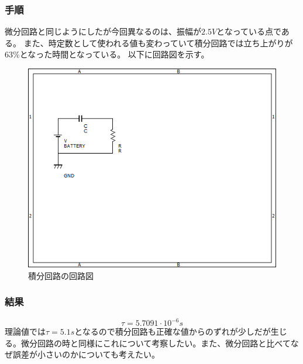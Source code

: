 \documentclass{jsarticle}
\begin{document}
\subsubsection{手順}
微分回路と同じようにしたが今回異なるのは、振幅が$2.5V$となっている点である。
また、時定数として使われる値も変わっていて積分回路では立ち上がりが$63\%$となった時間となっている。
以下に回路図を示す。
\begin{figure}[H]
    \centering
    \includegraphics[bb=0 0 500 400]{ex1_integral.png}
    \caption{積分回路の回路図}
\end{figure}

\subsubsection{結果}
\begin{equation}
    \tau = 5.7091 \cdot 10^{-6} s 
\end{equation}
理論値では$\tau = 5.1 s$となるので積分回路も正確な値からのずれが少しだが生じる。微分回路の時と同様にこれについて考察したい。また、微分回路と比べてなぜ誤差が小さいのかについても考えたい。
\end{document}
